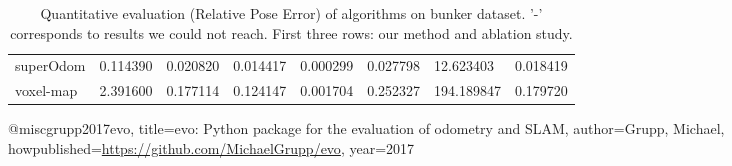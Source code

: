 \begin{table}[]
{\begin{tabular}{llllllll}
		superOdom & 0.114390 & 0.020820 & 0.014417 & 0.000299 & 0.027798 & 12.623403 & 0.018419 \\
		voxel-map & 2.391600 & 0.177114 & 0.124147 & 0.001704 & 0.252327 & 194.189847 & 0.179720 \\
        	\end{tabular}%
        }
        	\caption{Quantitative evaluation (Relative Pose Error\cite{grupp2017evo}) of algorithms on bunker dataset. '-' corresponds to results we could not reach. First three rows: our method and ablation study.}
        	\label{table3}
\end{table}

@misc{grupp2017evo,
  title={evo: Python package for the evaluation of odometry and SLAM},
  author={Grupp, Michael},
  howpublished={\url{https://github.com/MichaelGrupp/evo}},
  year={2017}
}

